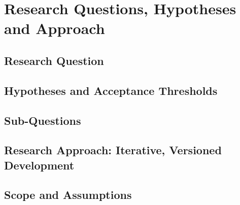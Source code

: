 \chapter{Research Questions, Hypotheses and Approach}
\label{ch:research-questions}

\section{Research Question}
\label{sec:rq-question}

\section{Hypotheses and Acceptance Thresholds}
\label{sec:rq-hypotheses}

\section{Sub-Questions}
\label{sec:rq-subquestions}

\section{Research Approach: Iterative, Versioned Development}
\label{sec:rq-approach}

\section{Scope and Assumptions}
\label{sec:rq-scope}
